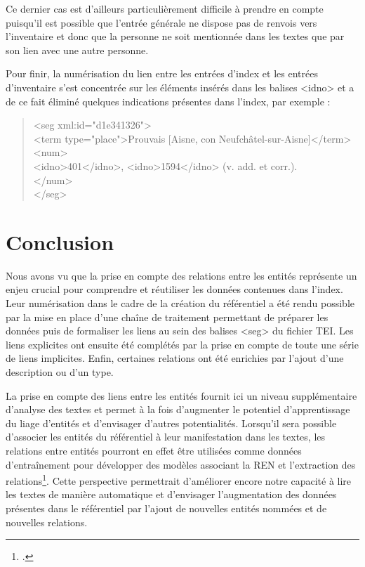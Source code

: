 \documentclass[a4paper,12pt,twoside]{book}
\begin{document}
	\noindent Ce dernier cas est d'ailleurs particulièrement difficile à prendre en compte puisqu'il est possible que l'entrée générale ne dispose pas de renvois vers l'inventaire et donc que la personne ne soit mentionnée dans les textes que par son lien avec une autre personne.
	
	Pour finir, la numérisation du lien entre les entrées d'index et les entrées d'inventaire s'est concentrée sur les éléments insérés dans les balises <idno> et a de ce fait éliminé quelques indications présentes dans l'index, par exemple :
	
	\begin{quotation}
		<seg xml:id="d1e341326">\\
		\indent\indent<term type="place">Prouvais [Aisne, con Neufchâtel-sur-Aisne]</term>\\
		\indent\indent<num>\\
		\indent\indent{}401</idno>, <idno>1594</idno> (v. add. et corr.).\\
		\indent{}\\
		\\
	\end{quotation}
	
	\section*{Conclusion}
	
	Nous avons vu que la prise en compte des relations entre les entités représente un enjeu crucial pour comprendre et réutiliser les données contenues dans l'index. Leur numérisation dans le cadre de la création du référentiel a été rendu possible par la mise en place d'une chaîne de traitement permettant de préparer les données puis de formaliser les liens au sein des balises <seg> du fichier TEI. Les liens explicites ont ensuite été complétés par la prise en compte de toute une série de liens implicites. Enfin, certaines relations ont été enrichies par l'ajout d'une description ou d'un type.
	
	La prise en compte des liens entre les entités fournit ici un niveau supplémentaire d'analyse des textes et permet à la fois d'augmenter le potentiel d'apprentissage du liage d'entités et d'envisager d'autres potentialités. Lorsqu'il sera possible d'associer les entités du référentiel à leur manifestation dans les textes, les relations entre entités pourront en effet être utilisées comme données d'entraînement pour développer des modèles associant la REN et l'extraction des relations\footcite[p. 169--180]{dupont_structuration_2017}. Cette perspective permettrait d'améliorer encore notre capacité à lire les textes de manière automatique et d'envisager l'augmentation des données présentes dans le référentiel par l'ajout de nouvelles entités nommées et de nouvelles relations.
	
\end{document}
